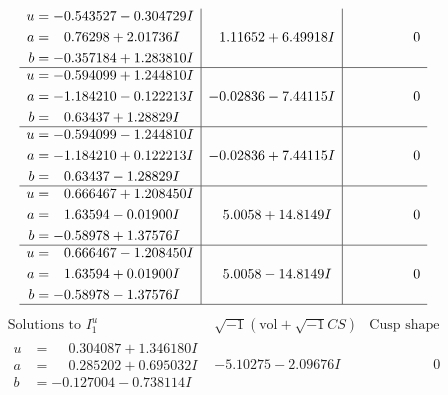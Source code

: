 \documentclass[1p]{elsarticle_modified}
\theoremstyle{definition}
\newcommand{\I}{\sqrt{-1}}
\begin{document}
$$\begin{array}{c|c|c}
\begin{aligned}
u &= -0.543527 - 0.304729 I \\
a &= \phantom{-}0.76298 + 2.01736 I \\
b &= -0.357184 + 1.283810 I\end{aligned}
 & \phantom{-}1.11652 + 6.49918 I & \phantom{-0.000000 } 0 \\ \hline\begin{aligned}
u &= -0.594099 + 1.244810 I \\
a &= -1.184210 - 0.122213 I \\
b &= \phantom{-}0.63437 + 1.28829 I\end{aligned}
 & -0.02836 - 7.44115 I & \phantom{-0.000000 } 0 \\ \hline\begin{aligned}
u &= -0.594099 - 1.244810 I \\
a &= -1.184210 + 0.122213 I \\
b &= \phantom{-}0.63437 - 1.28829 I\end{aligned}
 & -0.02836 + 7.44115 I & \phantom{-0.000000 } 0 \\ \hline\begin{aligned}
u &= \phantom{-}0.666467 + 1.208450 I \\
a &= \phantom{-}1.63594 - 0.01900 I \\
b &= -0.58978 + 1.37576 I\end{aligned}
 & \phantom{-}5.0058 + 14.8149 I & \phantom{-0.000000 } 0 \\ \hline\begin{aligned}
u &= \phantom{-}0.666467 - 1.208450 I \\
a &= \phantom{-}1.63594 + 0.01900 I \\
b &= -0.58978 - 1.37576 I\end{aligned}
 & \phantom{-}5.0058 - 14.8149 I & \phantom{-0.000000 } 0\\
 \hline 
 \end{array}$$\newpage$$\begin{array}{c|c|c}  
\text{Solutions to }I^u_{1}& \I (\text{vol} + \sqrt{-1}CS) & \text{Cusp shape}\\
 \hline 
\begin{aligned}
u &= \phantom{-}0.304087 + 1.346180 I \\
a &= \phantom{-}0.285202 + 0.695032 I \\
b &= -0.127004 - 0.738114 I\end{aligned}
 & -5.10275 - 2.09676 I & \phantom{-0.000000 } 0 \\ \hline\begin{aligned}

\end{aligned}
\end{array}$$
\end{document}
